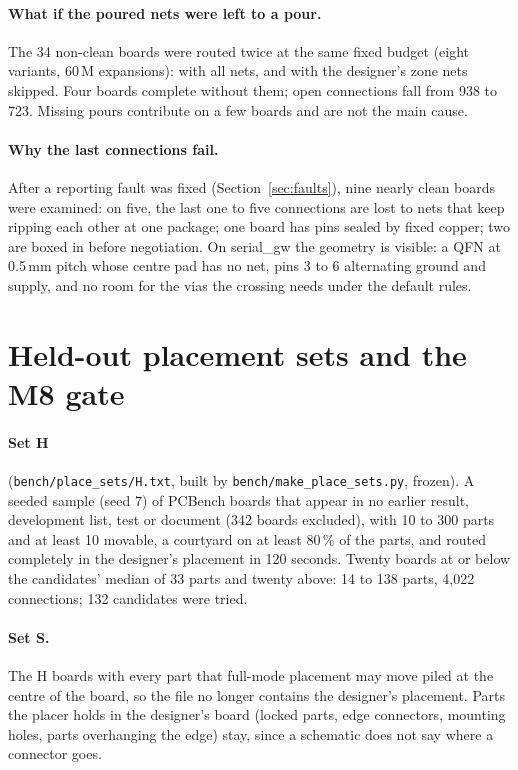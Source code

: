 \documentclass[10pt,a4paper]{article}
\newcommand{\code}[1]{\texttt{#1}}
\begin{document}
\paragraph{What if the poured nets were left to a pour.} The 34 non-clean boards were routed twice at the same
fixed budget (eight variants, 60\,M expansions): with all nets, and with the designer's zone nets skipped. Four
boards complete without them; open connections fall from 938 to 723. Missing pours contribute on a few boards and
are not the main cause.

\paragraph{Why the last connections fail.} After a reporting fault was fixed (Section~\ref{sec:faults}), nine
nearly clean boards were examined: on five, the last one to five connections are lost to nets that keep ripping
each other at one package; one board has pins sealed by fixed copper; two are boxed in before negotiation. On
serial\_gw the geometry is visible: a QFN at 0.5\,mm pitch whose centre pad has no net, pins 3 to 6 alternating
ground and supply, and no room for the vias the crossing needs under the default rules.

\section{Held-out placement sets and the M8 gate}\label{sec:held}

\paragraph{Set H} (\code{bench/place\_sets/H.txt}, built by \code{bench/make\_place\_sets.py}, frozen). A seeded
sample (seed 7) of PCBench boards that appear in no earlier result, development list, test or document (342 boards
excluded), with 10 to 300 parts and at least 10 movable, a courtyard on at least 80\,\% of the parts, and routed
completely in the designer's placement in 120 seconds. Twenty boards at or below the candidates' median of 33
parts and twenty above: 14 to 138 parts, 4,022 connections; 132 candidates were tried.

\paragraph{Set S.} The H boards with every part that full-mode placement may move piled at the centre of the
board, so the file no longer contains the designer's placement. Parts the placer holds in the designer's board
(locked parts, edge connectors, mounting holes, parts overhanging the edge) stay, since a schematic does not say
where a connector goes.
\end{document}
